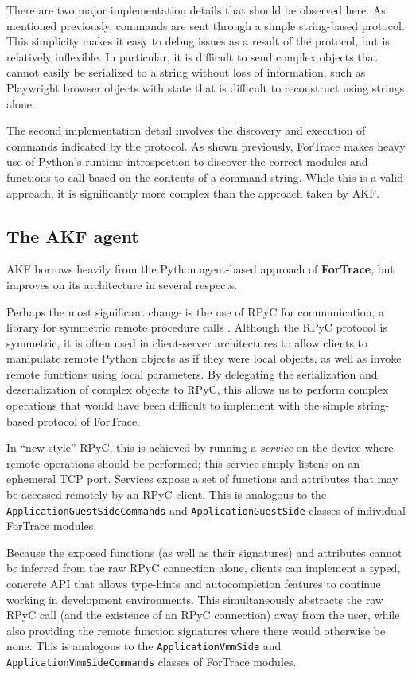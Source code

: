 \documentclass[letterpaper,12pt]{report}
\newcommand{\passthrough}[1]{#1}
\begin{document}
There are two major implementation details that should be observed here.
As mentioned previously, commands are sent through a simple string-based
protocol. This simplicity makes it easy to debug issues as a result of
the protocol, but is relatively inflexible. In particular, it is
difficult to send complex objects that cannot easily be serialized to a
string without loss of information, such as Playwright browser objects
with state that is difficult to reconstruct using strings alone.

The second implementation detail involves the discovery and execution of
commands indicated by the protocol. As shown previously, ForTrace makes
heavy use of Python's runtime introspection to discover the correct
modules and functions to call based on the contents of a command string.
While this is a valid approach, it is significantly more complex than
the approach taken by AKF.

\subsection{The AKF agent}\label{the-akf-agent}

AKF borrows heavily from the Python agent-based approach of
\textbf{ForTrace}, but improves on its architecture in several respects.

Perhaps the most significant change is the use of RPyC for
communication, a library for symmetric remote procedure calls
\cite{TomerfilibaorgRpyc2025}. Although the RPyC protocol is
symmetric, it is often used in client-server architectures to allow
clients to manipulate remote Python objects as if they were local
objects, as well as invoke remote functions using local parameters. By
delegating the serialization and deserialization of complex objects to
RPyC, this allows us to perform complex operations that would have been
difficult to implement with the simple string-based protocol of
ForTrace.

In ``new-style'' RPyC, this is achieved by running a \emph{service} on
the device where remote operations should be performed; this service
simply listens on an ephemeral TCP port. Services expose a set of
functions and attributes that may be accessed remotely by an RPyC
client. This is analogous to the
\passthrough{\lstinline!ApplicationGuestSideCommands!} and
\passthrough{\lstinline!ApplicationGuestSide!} classes of individual
ForTrace modules.

Because the exposed functions (as well as their signatures) and
attributes cannot be inferred from the raw RPyC connection alone,
clients can implement a typed, concrete API that allows type-hints and
autocompletion features to continue working in development environments.
This simultaneously abstracts the raw RPyC call (and the existence of an
RPyC connection) away from the user, while also providing the remote
function signatures where there would otherwise be none. This is
analogous to the \passthrough{\lstinline!ApplicationVmmSide!} and
\passthrough{\lstinline!ApplicationVmmSideCommands!} classes of ForTrace
modules.
\end{document}
